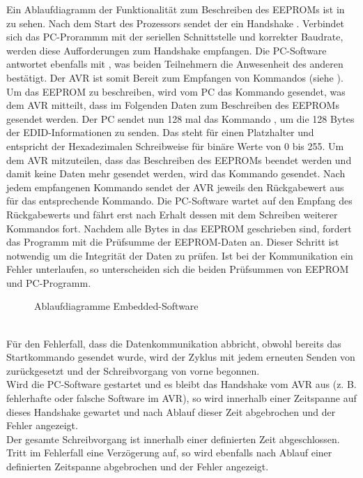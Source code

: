 Ein Ablaufdiagramm der Funktionalität zum Beschreiben des EEPROMs ist in  zu sehen. Nach dem Start des Prozessors sendet der ein Handshake . Verbindet sich das PC-Prorammm mit der seriellen Schnittstelle und korrekter Baudrate, werden diese Aufforderungen zum Handshake empfangen. Die PC-Software antwortet ebenfalls mit , was beiden Teilnehmern die Anwesenheit des anderen bestätigt. Der AVR ist somit Bereit zum Empfangen von Kommandos (siehe ). Um das EEPROM zu beschreiben, wird vom PC das Kommando  gesendet, was dem AVR mitteilt, dass im Folgenden Daten zum Beschreiben des EEPROMs gesendet werden. Der PC sendet nun 128 mal das Kommando , um die 128 Bytes der EDID-Informationen zu senden. Das  steht für einen Platzhalter und entspricht der Hexadezimalen Schreibweise für binäre Werte von 0 bis 255. Um dem AVR mitzuteilen, dass das Beschreiben des EEPROMs beendet werden und damit keine Daten mehr gesendet werden, wird das Kommando  gesendet. Nach jedem empfangenen Kommando sendet der AVR jeweils den Rückgabewert aus  für das entsprechende Kommando. Die PC-Software wartet auf den Empfang des Rückgabewerts und fährt erst nach Erhalt dessen mit dem Schreiben weiterer Kommandos fort. Nachdem alle Bytes in das EEPROM geschrieben sind, fordert das Programm mit  die Prüfsumme der EEPROM-Daten an. Dieser Schritt ist notwendig um die Integrität der Daten zu prüfen. Ist bei der Kommunikation ein Fehler unterlaufen, so unterscheiden sich die beiden Prüfsummen von EEPROM und PC-Programm.\\
\begin{figure}[htp]
	\center
    \caption{Ablaufdiagramme Embedded-Software}
    \label{fig:ablaufdiagramm_avr} 
\end{figure}\\

Für den Fehlerfall, dass die Datenkommunikation abbricht, obwohl bereits das Startkommando  gesendet wurde, wird der Zyklus mit jedem erneuten Senden von  zurückgesetzt und der Schreibvorgang von vorne begonnen.\\
Wird die PC-Software gestartet und es bleibt das Handshake vom AVR aus (z. B. fehlerhafte oder falsche Software im AVR), so wird innerhalb einer Zeitspanne auf dieses Handshake gewartet und nach Ablauf dieser Zeit abgebrochen und der Fehler angezeigt.\\
Der gesamte Schreibvorgang ist innerhalb einer definierten Zeit abgeschlossen. Tritt im Fehlerfall eine Verzögerung auf, so wird ebenfalls nach Ablauf einer definierten Zeitspanne abgebrochen und der Fehler angezeigt.

